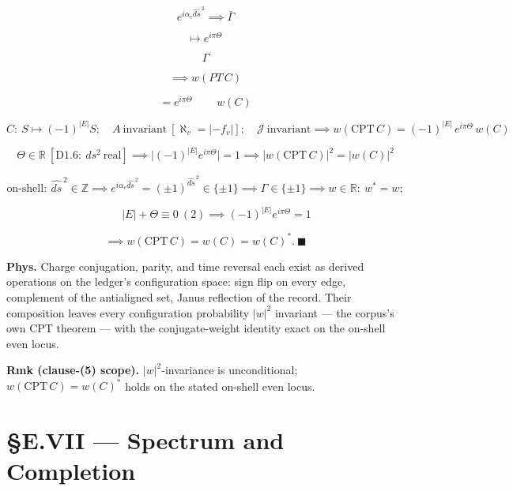 \begin{theorem}
\[
e^{i\alpha_e\widehat{ds}^{\,2}}\implies\bar\Gamma
\]

\[
\mapsto e^{i\pi\Theta}\,
\]

\[
\Gamma
\]

\[
\implies w(PT\,C)
\]

\[
= e^{i\pi\Theta}\,\qquad w(C)
\]

\[
C:\ S\mapsto(-1)^{|E|}S;\quad A\ \text{invariant}\ [\aleph_v=|-f_v|];\quad\mathcal J\ \text{invariant}\implies w(\mathrm{CPT}\,C)=(-1)^{|E|}\,e^{i\pi\Theta}\,w(C)
\]

\[
\Theta\in\mathbb R\ [\mathrm{D1.6}:\ ds^2\ \text{real}]\implies\bigl|(-1)^{|E|}e^{i\pi\Theta}\bigr|=1\implies|w(\mathrm{CPT}\,C)|^2=|w(C)|^2
\]

\[
\text{on-shell}:\ \widehat{ds}^{\,2}\in\mathbb Z\implies e^{i\alpha_e\widehat{ds}^{\,2}}=(\pm1)^{\widehat{ds}^{\,2}}\in\{\pm1\}\implies\Gamma\in\{\pm1\}\implies w\in\mathbb R:\ w^\ast=w;
\]

\[
\qquad |E|+\Theta\equiv0\ (2)\implies(-1)^{|E|}e^{i\pi\Theta}=1
\]

\[
\implies w(\mathrm{CPT}\,C)=w(C)=w(C)^\ast .\ \blacksquare
\]

\textbf{Phys.} Charge conjugation, parity, and time reversal each exist as derived operations on the ledger's configuration space: sign flip on every edge, complement of the antialigned set, Janus reflection of the record. Their composition leaves every configuration probability $|w|^2$ invariant — the corpus's own CPT theorem — with the conjugate-weight identity exact on the on-shell even locus.

\textbf{Rmk (clause-(5) scope).} $|w|^2$-invariance is unconditional; $w(\mathrm{CPT}\,C)=w(C)^\ast$ holds on the stated on-shell even locus.

\end{theorem}

\section[§E.VII — Spectrum and Completion]{\texorpdfstring{§E.VII — Spectrum and Completion}{SE.VII - Spectrum and Completion}}

